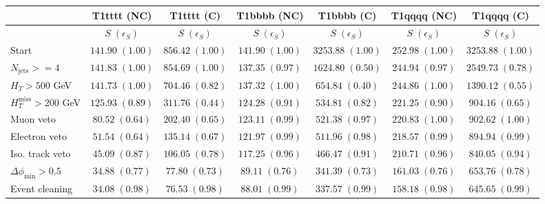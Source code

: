 \documentclass[11pt]{amsart}
\newcommand{\njets}{N_{\mathrm{jets}}}
\newcommand{\HT}{H_{T}}
\newcommand{\MHT}{H_{T}^{\mathrm{miss}}}
\newcommand{\dphi}{\Delta \phi_{\mathrm{min}}}
\begin{document}
\begin{table}[h]
\centering
\begin{tabular}{lcccccc}
\hline
\hline
& T1tttt (NC) & T1tttt (C) & T1bbbb (NC) & T1bbbb (C) & T1qqqq (NC) & T1qqqq (C) \\ \hline
& $S\;(\epsilon_S)$ & $S\;(\epsilon_S)$ & $S\;(\epsilon_S)$ & $S\;(\epsilon_S)$ & $S\;(\epsilon_S)$ &$S\;(\epsilon_S)$ \\ \hline
Start & $141.90\;(1.00)$ & $856.42\;(1.00)$ & $141.90\;(1.00)$ & $3253.88\;(1.00)$ & $252.98\;(1.00)$ & $3253.88\;(1.00)$ \\
$\njets >=4$ & $141.83\;(1.00)$ & $854.69\;(1.00)$ & $137.35\;(0.97)$ & $1624.80\;(0.50)$ & $244.94\;(0.97)$ & $2549.73\;(0.78)$ \\
$\HT > 500$ GeV & $141.73\;(1.00)$ & $704.46\;(0.82)$ & $137.32\;(1.00)$ & $654.84\;(0.40)$ & $244.86\;(1.00)$ & $1390.12\;(0.55)$ \\
$\MHT > 200$ GeV & $125.93\;(0.89)$ & $311.76\;(0.44)$ & $124.28\;(0.91)$ & $534.81\;(0.82)$ & $221.25\;(0.90)$ & $904.16\;(0.65)$ \\
Muon veto & $80.52\;(0.64)$ & $202.40\;(0.65)$ & $123.11\;(0.99)$ & $521.38\;(0.97)$ & $220.83\;(1.00)$ & $902.62\;(1.00)$ \\
Electron veto & $51.54\;(0.64)$ & $135.14\;(0.67)$ & $121.97\;(0.99)$ & $511.96\;(0.98)$ & $218.57\;(0.99)$ & $894.94\;(0.99)$ \\
Iso. track veto & $45.09\;(0.87)$ & $106.05\;(0.78)$ & $117.25\;(0.96)$ & $466.47\;(0.91)$ & $210.71\;(0.96)$ & $840.05\;(0.94)$ \\
$\dphi>0.5$ & $34.88\;(0.77)$ & $77.80\;(0.73)$ & $89.11\;(0.76)$ & $341.39\;(0.73)$ & $161.03\;(0.76)$ & $653.76\;(0.78)$ \\
Event cleaning & $34.08\;(0.98)$ & $76.53\;(0.98)$ & $88.01\;(0.99)$ & $337.57\;(0.99)$ & $158.18\;(0.98)$ & $645.65\;(0.99)$ \\
\hline
\hline
\end{tabular}
\end{table}
\end{document}
